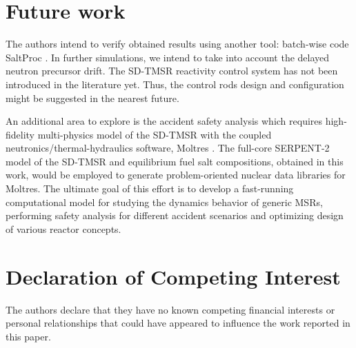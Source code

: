 \section{Future work}
The authors intend to verify obtained results using another tool: batch-wise 
code SaltProc \cite{rykhlevskii_arfc/saltproc_2018,rykhlevskii_milestone_2019}.
In further simulations, we intend to take into account the delayed 
neutron precursor drift. The \gls{SD-TMSR} reactivity control system has not 
been introduced in the literature yet. Thus, the control rods design and 
configuration might be suggested in the nearest future.

An additional area to explore is the accident safety analysis which 
requires high-fidelity multi-physics model of the \gls{SD-TMSR} with the 
coupled neutronics/thermal-hydraulics software, Moltres 
\cite{lindsay_introduction_2018}. The full-core SERPENT-2 model of the 
\gls{SD-TMSR} and equilibrium fuel salt compositions, obtained in this work, 
would be employed to generate problem-oriented nuclear data libraries for 
Moltres. The ultimate goal of this effort is to develop a 
fast-running computational model for studying the dynamics behavior of generic 
\glspl{MSR}, performing safety analysis for different accident scenarios and 
optimizing design of various reactor concepts.

\section{Declaration of Competing Interest}

The authors declare that they have no known competing financial interests or personal relationships that could have appeared to influence the work reported in this paper.
